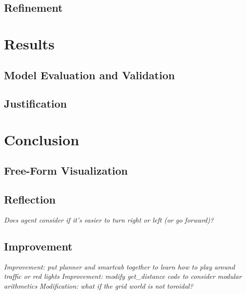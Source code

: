 \documentclass{article}
\begin{document}
\subsection{Refinement}

\section{Results}

\subsection{Model Evaluation and Validation}
\subsection{Justification}


\section{Conclusion}

\subsection{Free-Form Visualization}
\subsection{Reflection}
\textit{Does agent consider if it's easier to turn right or left (or go forward)?}
\subsection{Improvement}
\textit{Improvement: put planner and smartcab together to learn how to play around traffic or red lights}
\textit{Improvement: modify get\_distance code to consider modular arithmetics}
\textit{Modification: what if the grid world is not toroidal?}
\end{document}
